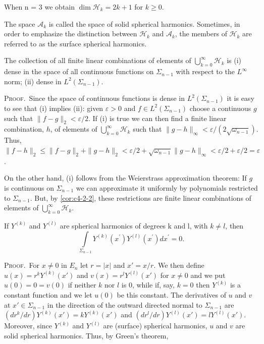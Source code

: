 When n = 3 we obtain $\dim \mathcal{H}_k = 2k + 1$ for $k \geq 0$.

The space $\mathcal{A}_k$ is called the space of solid spherical harmonics. Sometimes, in order to emphasize the distinction between $\mathcal{H}_k$ and $\mathcal{A}_k$, the members of $\mathcal{H}_k$ are referred to as the surface spherical harmonics.

\begin{corollary}
\label{cor:c4-2-3}
The collection of all finite linear combinations of elements of $\bigcup_{k=0}^{\infty} \mathcal{H}_{k}$ is
(i) dense in the space of all continuous functions on $\Sigma_{n-1}$ with respect to the $L^\infty$ norm;
(ii) dense in $L^{2}(\Sigma_{n-1})$.
\end{corollary}

\textsc{Proof.}\ Since the space of continuous functions is dense in $L^2(\Sigma_{n-1})$ it is easy to see that (i) implies (ii): given $\varepsilon > 0$ and $f \in L^2(\Sigma_{n-1})$ choose a continuous $g$ such that $\|f - g\|_2 < \varepsilon/2$. If (i) is true we can then find a finite linear combination, $h$, of elements of $\bigcup_{k=0}^{\infty} \mathcal{H}_k$ such that $\|g - h\|_\infty < \varepsilon/(2\sqrt{\omega_{n-1}})$. Thus, $\|f - h\|_2 \leq \|f - g\|_2 + \|g - h\|_2 < \varepsilon/2 + \sqrt{\omega_{n-1}} \|g - h\|_\infty < \varepsilon/2 + \varepsilon/2 = \varepsilon$.

On the other hand, (i) follows from the Weierstrass approximation theorem: If $g$ is continuous on $\Sigma_{n-1}$ we can approximate it uniformly by polynomials restricted to $\Sigma_{n-1}$. But, by \eqref{cor:c4-2-2}, these restrictions are finite linear combinations of elements of $\bigcup_{k=0}^{\infty} \mathcal{H}_k$.

\begin{corollary}
\label{cor:c4-2-4}
If $Y^{(k)}$ and $Y^{(l)}$ are spherical harmonics of degrees k and l, with $k \neq l$, then
\[
\int\limits_{\Sigma_{n-1}}Y^{(k)}(x^{\prime})Y^{(l)}(x^{\prime})d x^{\prime}=0.
\]

\end{corollary}

\textsc{Proof.}\ For $x \neq 0$ in $E_n$ let $r = |x|$ and $x' = x/r$. We then define $u(x) = r^k Y^{(k)}(x')$ and $v(x) = r^l Y^{(l)}(x')$ for $x \neq 0$ and we put $u(0) = 0 = v(0)$ if neither $k$ nor $l$ is 0, while if, say, $k = 0$ then $Y^{(k)}$ is a constant function and we let $u(0)$ be this constant. The derivatives of $u$ and $v$ at $x' \in \Sigma_{n-1}$ in the direction of the outward directed normal to $\Sigma_{n-1}$ are $(dr^k/dr) Y^{(k)}(x') = k Y^{(k)}(x')$ and $(dr^l/dr) Y^{(l)}(x') = l Y^{(l)}(x')$. Moreover, since $Y^{(k)}$ and $Y^{(l)}$ are (surface) spherical harmonics, $u$ and $v$ are solid spherical harmonics. Thus, by Green's theorem,

